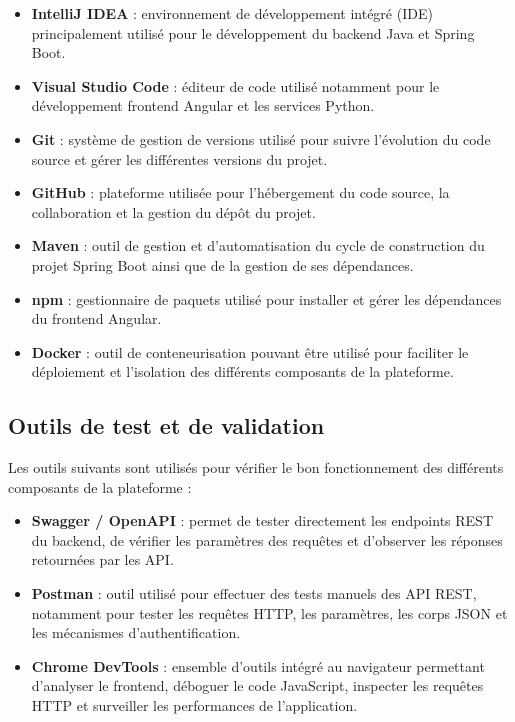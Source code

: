 \documentclass[12pt,a4paper]{report}
\begin{document}
\begin{itemize}
    \item \textbf{IntelliJ IDEA} : environnement de développement intégré
    (IDE) principalement utilisé pour le développement du backend Java et
    Spring Boot.

    \item \textbf{Visual Studio Code} : éditeur de code utilisé notamment
    pour le développement frontend Angular et les services Python.

    \item \textbf{Git} : système de gestion de versions utilisé pour suivre
    l'évolution du code source et gérer les différentes versions du projet.

    \item \textbf{GitHub} : plateforme utilisée pour l'hébergement du code
    source, la collaboration et la gestion du dépôt du projet.

    \item \textbf{Maven} : outil de gestion et d'automatisation du cycle de
    construction du projet Spring Boot ainsi que de la gestion de ses
    dépendances.

    \item \textbf{npm} : gestionnaire de paquets utilisé pour installer et
    gérer les dépendances du frontend Angular.

    \item \textbf{Docker} : outil de conteneurisation pouvant être utilisé
    pour faciliter le déploiement et l'isolation des différents composants
    de la plateforme.
\end{itemize}

\subsection{Outils de test et de validation}

Les outils suivants sont utilisés pour vérifier le bon fonctionnement des
différents composants de la plateforme :

\begin{itemize}
    \item \textbf{Swagger / OpenAPI} : permet de tester directement les
    endpoints REST du backend, de vérifier les paramètres des requêtes et
    d'observer les réponses retournées par les API.

    \item \textbf{Postman} : outil utilisé pour effectuer des tests manuels
    des API REST, notamment pour tester les requêtes HTTP, les paramètres,
    les corps JSON et les mécanismes d'authentification.

    \item \textbf{Chrome DevTools} : ensemble d'outils intégré au navigateur
    permettant d'analyser le frontend, déboguer le code JavaScript,
    inspecter les requêtes HTTP et surveiller les performances de
    l'application.
\end{itemize}
\end{document}
